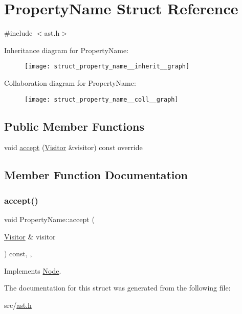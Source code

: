 \hypertarget{struct_property_name}{}\section{Property\+Name Struct Reference}
\label{struct_property_name}


{\ttfamily \#include $<$ast.\+h$>$}



Inheritance diagram for Property\+Name\+:\nopagebreak
\begin{figure}[H]
\begin{center}
\leavevmode
\texttt{[image: struct\_property\_name\_\_inherit\_\_graph]}
\end{center}
\end{figure}


Collaboration diagram for Property\+Name\+:\nopagebreak
\begin{figure}[H]
\begin{center}
\leavevmode
\texttt{[image: struct\_property\_name\_\_coll\_\_graph]}
\end{center}
\end{figure}
\subsection*{Public Member Functions}
\begin{DoxyCompactItemize}
\item 
void \hyperlink{struct_property_name_a95857be8c40022cf788e3b11aa70cdc7}{accept} (\hyperlink{struct_visitor}{Visitor} \&visitor) const override
\end{DoxyCompactItemize}


\subsection{Member Function Documentation}
\mbox{\label{struct_property_name_a95857be8c40022cf788e3b11aa70cdc7}} 
\subsubsection{\texorpdfstring{accept()}{accept()}}
{\footnotesize\ttfamily void Property\+Name\+::accept (\begin{DoxyParamCaption}\item[{\hyperlink{struct_visitor}{Visitor} \&}]{visitor }\end{DoxyParamCaption}) const\hspace{0.3cm}{\ttfamily [inline]}, {\ttfamily [override]}, {\ttfamily [virtual]}}



Implements \hyperlink{struct_node_a10bd7af968140bbf5fa461298a969c71}{Node}.



The documentation for this struct was generated from the following file\+:\begin{DoxyCompactItemize}
\item 
src/\hyperlink{ast_8h}{ast.\+h}\end{DoxyCompactItemize}
